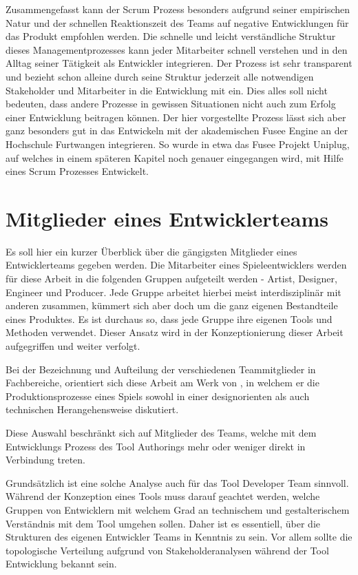\documentclass[pagesize, paper=a4, fontsize=12pt, titlepage=true, headings=small, headnosepline, abstractoff, liststotoc, nochapterprefix, plainheadsepline, twoside]{scrreprt}
\begin{document}
Zusammengefasst kann der Scrum Prozess besonders aufgrund seiner empirischen Natur und der schnellen Reaktionszeit des Teams auf negative Entwicklungen für das Produkt empfohlen werden. Die schnelle und leicht verständliche Struktur dieses Managementprozesses kann jeder Mitarbeiter schnell verstehen und in den Alltag seiner Tätigkeit als Entwickler integrieren. Der Prozess ist sehr transparent und bezieht schon alleine durch seine Struktur jederzeit alle notwendigen Stakeholder und Mitarbeiter in die Entwicklung mit ein. Dies alles soll nicht bedeuten, dass andere Prozesse in gewissen Situationen nicht auch zum Erfolg einer Entwicklung beitragen können. Der hier vorgestellte Prozess lässt sich aber ganz besonders gut in das Entwickeln mit der akademischen Fusee Engine an der Hochschule Furtwangen integrieren. So wurde in etwa das Fusee Projekt Uniplug, auf welches in einem späteren Kapitel noch genauer eingegangen wird, mit Hilfe eines Scrum Prozesses Entwickelt. 

\section{Mitglieder eines Entwicklerteams}
Es soll hier ein kurzer Überblick über die gängigsten Mitglieder eines Entwicklerteams gegeben werden. Die Mitarbeiter eines Spieleentwicklers werden für diese Arbeit in die folgenden Gruppen aufgeteilt werden - Artist, Designer, Engineer und Producer. Jede Gruppe arbeitet hierbei meist interdisziplinär mit anderen zusammen, kümmert sich aber doch um die ganz eigenen Bestandteile eines Produktes. Es ist durchaus so, dass jede Gruppe ihre eigenen Tools und Methoden verwendet. Dieser Ansatz wird in der Konzeptionierung dieser Arbeit aufgegriffen und weiter verfolgt.

Bei der Bezeichnung und Aufteilung der verschiedenen Teammitglieder in Fachbereiche, orientiert sich diese Arbeit am Werk von , in welchem er die Produktionsprozesse eines Spiels sowohl in einer designorienten als auch technischen Herangehensweise diskutiert.

Diese Auswahl beschränkt sich auf Mitglieder des Teams, welche mit dem Entwicklungs Prozess des Tool Authorings mehr oder weniger direkt in Verbindung treten.

Grundsätzlich ist eine solche Analyse auch für das Tool Developer Team sinnvoll. Während der Konzeption eines Tools muss darauf geachtet werden, welche Gruppen von Entwicklern mit welchem Grad an technischem und gestalterischem Verständnis mit dem Tool umgehen sollen. Daher ist es essentiell, über die Strukturen des eigenen Entwickler Teams in Kenntnis zu sein. Vor allem sollte die topologische Verteilung aufgrund von Stakeholderanalysen während der Tool Entwicklung bekannt sein. 
\end{document}
